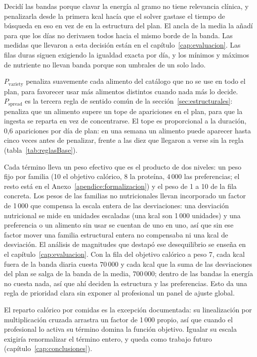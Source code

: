 Decidí las bandas porque clavar la energía al gramo no tiene relevancia clínica, y penalizarla desde la primera kcal hacía que el solver gastase el tiempo de búsqueda en eso en vez de en la estructura del plan. El ancla de la media la añadí para que los días no derivasen todos hacia el mismo borde de la banda. Las medidas que llevaron a esta decisión están en el capítulo~\ref{cap:evaluacion}. Las filas duras siguen exigiendo la igualdad exacta por día, y los mínimos y máximos de nutriente no llevan banda porque son umbrales de un solo lado.

$P_{\text{variety}}$ penaliza suavemente cada alimento del catálogo que no se use en todo el plan, para favorecer usar más alimentos distintos cuando nada más lo decide. $P_{\text{spread}}$ es la tercera regla de sentido común de la sección~\ref{sec:estructurales}: penaliza que un alimento supere un tope de apariciones en el plan, para que la ingesta se reparta en vez de concentrarse. El tope es proporcional a la duración, 0,6 apariciones por día de plan: en una semana un alimento puede aparecer hasta cinco veces antes de penalizar, frente a las diez que llegaron a verse sin la regla (tabla~\ref{tab:reglasBase}).

Cada término lleva un peso efectivo que es el producto de dos niveles: un peso fijo por familia (10 el objetivo calórico, 8 la proteína, $4\,000$ las preferencias; el resto está en el Anexo~\ref{apendice:formalizacion}) y el peso de 1 a 10 de la fila concreta. Los pesos de las familias no nutricionales llevan incorporado un factor de 1\,000 que compensa la escala entera de las desviaciones: una desviación nutricional se mide en unidades escaladas (una kcal son 1\,000 unidades) y una preferencia o un alimento sin usar se cuentan de uno en uno, así que sin ese factor mover una familia estructural entera no compensaba ni una kcal de desviación. El análisis de magnitudes que destapó ese desequilibrio se enseña en el capítulo~\ref{cap:evaluacion}. Con la fila del objetivo calórico a peso 7, cada kcal fuera de la banda diaria cuesta $70\,000$ y cada kcal que la suma de las desviaciones del plan se salga de la banda de la media, $700\,000$; dentro de las bandas la energía no cuesta nada, así que ahí deciden la estructura y las preferencias. Esto da una regla de prioridad clara sin exponer al profesional un panel de ajuste global.

El reparto calórico por comidas es la excepción documentada: su linealización por multiplicación cruzada arrastra un factor de 1\,000 propio, así que cuando el profesional lo activa su término domina la función objetivo. Igualar su escala exigiría renormalizar el término entero, y queda como trabajo futuro (capítulo~\ref{cap:conclusiones}).

